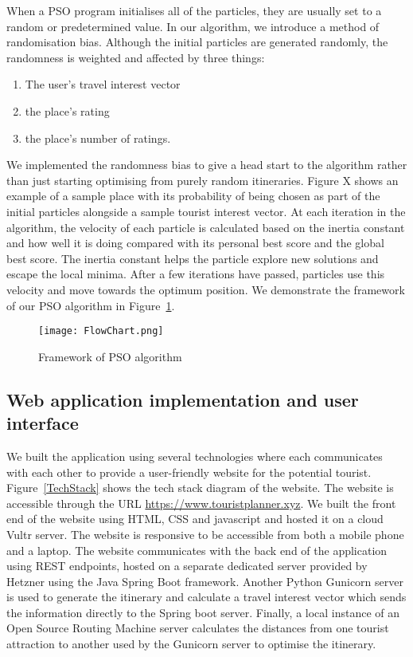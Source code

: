 When a PSO program initialises all of the particles,
they are usually set to a random or predetermined
value. In our algorithm, we introduce a method of
randomisation bias. Although the initial particles are
generated randomly, the randomness is weighted and
affected by three things: 
\begin{enumerate}
    
    \item The user's travel interest vector 
    \item the place's rating 
    \item the place's number of ratings.

\end{enumerate}
  We implemented the randomness bias to give a
head start to the algorithm rather than just starting
optimising from purely random itineraries. Figure X
shows an example of a sample place with its
probability of being chosen as part of the initial
particles alongside a sample tourist interest vector.
At each iteration in the algorithm, the velocity of
each particle is calculated based on the inertia
constant and how well it is doing compared with its
personal best score and the global best score. The
inertia constant helps the particle explore new
solutions and escape the local minima. After a few
iterations have passed, particles use this velocity
and move towards the optimum position. We demonstrate
the framework of our PSO algorithm in Figure~\ref{FlowChart}.

\begin{figure}[H]
\centering
\texttt{[image: FlowChart.png]}
\caption{Framework of PSO algorithm}
\label{FlowChart}
\end{figure}

\subsection{Web application implementation and user
interface}

We built the application using several technologies
where each communicates with each other to provide a
user-friendly website for the potential tourist.
Figure~\ref{TechStack} shows the tech stack diagram of the website.
The website is accessible through the URL
\url{https://www.touristplanner.xyz}. We built the front end of the website using HTML, CSS and javascript and hosted it
on a cloud Vultr server. The website is 
responsive to be accessible from both a
mobile phone and a laptop. The website communicates
with the back end of the application using REST
endpoints, hosted on a separate dedicated server
provided by Hetzner using the Java Spring Boot
framework.  Another Python Gunicorn server is used to
generate the itinerary and calculate a travel interest
vector which sends the information directly to the
Spring boot server. Finally, a local instance of an
Open Source Routing Machine server calculates the
distances from one tourist attraction to another used
by the Gunicorn server to optimise the itinerary. 

